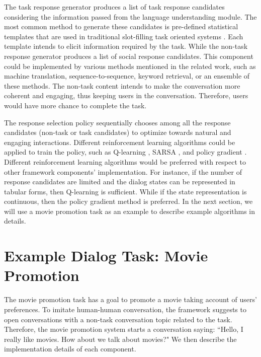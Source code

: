 \documentclass[11pt]{article}
\begin{document}
The task response generator produces a list of task response candidates considering the information passed from the language understanding module. The most common method to generate these candidates is pre-defined statistical templates that are used in traditional slot-filling task oriented systems \cite{rambow2001natural}. Each template intends to elicit information required by the task. While the non-task response generator produces a list of social response candidates. This component could be implemented by various methods mentioned in the related work, such as machine translation, sequence-to-sequence, keyword retrieval, or an ensemble of these methods. The non-task content intends to make the conversation more coherent and engaging, thus keeping users in the conversation. Therefore, users would have more chance to complete the task. 


The response selection policy sequentially chooses among all the response candidates (non-task or task candidates) to optimize towards natural and engaging interactions. Different reinforcement learning algorithms could be applied to train the policy, such as Q-learning \cite{sutton1998reinforcement}, SARSA \cite{sutton1998reinforcement}, and policy gradient \cite{sutton1998reinforcement}. Different reinforcement learning algorithms would be preferred with respect to other framework components' implementation. For instance, if the number of response candidates are limited and the dialog states can be represented in tabular forms, then Q-learning is sufficient. While if the state representation is continuous, then the policy gradient method is preferred. In the next section, we will use a movie promotion task as an example to describe example algorithms in details.
% 






\section{Example Dialog Task: Movie Promotion}
The movie promotion task has a goal to promote a movie taking account of users' preferences. To imitate human-human conversation, the framework suggests to open conversations with a non-task conversation topic related to the task. Therefore, the movie promotion system starts a conversation saying: ``Hello, I really like movies. How about we talk about movies?" We then describe the implementation details of each component.
\end{document}

